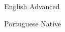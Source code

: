 

\begin{cvskills}

  \cvskill
    {English} %
    {Advanced} %

  \cvskill
    {Portuguese} %
    {Native} %

\end{cvskills}
